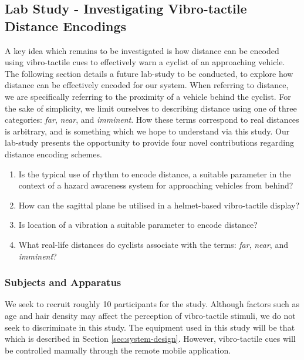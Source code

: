 \documentclass{interim}
\begin{document}
\subsection{Lab Study - Investigating Vibro-tactile Distance Encodings}\label{sec:lab-study}
A key idea which remains to be investigated is how distance can be encoded using vibro-tactile cues to effectively warn a cyclist of an approaching vehicle. The following section details a future lab-study to be conducted, to explore how distance can be effectively encoded for our system. When referring to distance, we are specifically referring to the proximity of a vehicle behind the cyclist. For the sake of simplicity, we limit ourselves to describing distance using one of three categories:\textit{ far}, \textit{near}, and \textit{imminent}. How these terms correspond to real distances is arbitrary, and is something which we hope to understand via this study. Our lab-study presents the opportunity to provide four novel contributions regarding distance encoding schemes.
\begin{enumerate}
    \item Is the typical use of rhythm to encode distance, a suitable parameter in the context of a hazard awareness system for approaching vehicles from behind?
    \item How can the sagittal plane be utilised in a helmet-based vibro-tactile display?
    \item Is location of a vibration a suitable parameter to encode distance?
    \item What real-life distances do cyclists associate with the terms: \textit{ far}, \textit{near}, and \textit{imminent}?
\end{enumerate}

\subsubsection{Subjects and Apparatus}
We seek to recruit roughly 10 participants for the study. Although factors such as age and hair density may affect the perception of vibro-tactile stimuli, we do not seek to discriminate in this study.
The equipment used in this study will be that which is described in Section \ref{sec:system-design}. However, vibro-tactile cues will be controlled manually through the remote mobile application.
\end{document}
